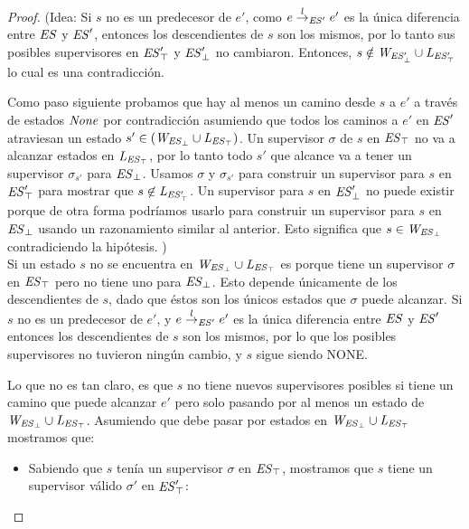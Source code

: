 \begin{proof}
	(Idea: Si $s$ no es un predecesor de $e'$, como $e \overset{l}{\rightarrow}_{\mathit{ES}'} e'$ es la única diferencia entre $\mathit{ES}$ y $\mathit{ES}'$, entonces los descendientes de $s$ son los mismos, 
	por lo tanto sus posibles supervisores en $\mathit{\mathit{ES}'_{\top}}$ y
	$\mathit{\mathit{ES}'_{\bot}}$ no cambiaron. Entonces, $s \notin \mathit{W_{\mathit{\mathit{ES}'_{\bot}}}} \cup 
	\mathit{L_{\mathit{\mathit{ES}'_{\top}}}}$ lo cual es una contradicción.
	
	Como paso siguiente probamos que hay al menos un camino desde $s$ a $e'$ a través de estados $\mathit{None}$ por contradicción asumiendo que todos los caminos a $e'$ en $\mathit{ES}'$ atraviesan un estado $s' \in 
	(\mathit{W_{\mathit{\mathit{ES}_{\bot}}}} \cup \mathit{L_{\mathit{\mathit{ES}_{\top}}}})$. Un supervisor $\sigma$ de $s$ en 
	$\mathit{\mathit{ES}_{\top}}$ no va a alcanzar estados en $\mathit{L_{\mathit{\mathit{ES}_{\top}}}}$, 
	por lo tanto todo $s'$ que alcance va a tener un supervisor $\sigma_{s'}$ para 
	$\mathit{\mathit{ES}_{\bot}}$. Usamos $\sigma$ y $\sigma_{s'}$ para construir un supervisor para $s$ en $\mathit{\mathit{ES}'_{\top}}$ para mostrar que $s 
	\not\in \mathit{L_{\mathit{\mathit{ES}'_{\top}}}}$.
	Un supervisor para $s$ en $\mathit{\mathit{ES}'_{\bot}}$ no puede existir porque de otra forma podríamos usarlo para construir un supervisor para $s$ en 
	$\mathit{\mathit{ES}_{\bot}}$ usando un razonamiento similar al anterior. Esto significa que $s \in 
	\mathit{W_{\mathit{\mathit{ES}_{\bot}}}}$ contradiciendo la hipótesis. )\\


Si un estado $s$ no se encuentra en $\mathit{W_{\mathit{\mathit{ES}_{\bot}}}} \cup \mathit{L_{\mathit{\mathit{ES}_{\top}}}}$ es porque tiene un supervisor $\sigma$ en $\mathit{\mathit{ES}_{\top}}$ pero no tiene uno para $\mathit{\mathit{ES}_{\bot}}$. Esto depende únicamente de los descendientes de $s$, dado que éstos son los únicos estados que $\sigma$ puede alcanzar. Si $s$ no es un predecesor de $e'$, y $e \overset{l}{\rightarrow}_{\mathit{ES}'} e'$ es la única diferencia entre $\mathit{ES}$ y $\mathit{ES}'$ entonces los descendientes de $s$ son los mismos, por lo que los posibles supervisores no tuvieron ningún cambio, y $s$ sigue siendo NONE.

Lo que no es tan claro, es que $s$ no tiene nuevos supervisores posibles si tiene un camino que puede alcanzar $e'$ pero solo pasando por al menos un estado de $\mathit{W_{\mathit{\mathit{ES}_{\bot}}}} \cup \mathit{L_{\mathit{\mathit{ES}_{\top}}}}$. Asumiendo que debe pasar por estados en $\mathit{W_{\mathit{\mathit{ES}_{\bot}}}} \cup \mathit{L_{\mathit{\mathit{ES}_{\top}}}}$ mostramos que:

\begin{itemize}
	\item Sabiendo que $s$ tenía un supervisor $\sigma$ en $\mathit{\mathit{ES}_{\top}}$, mostramos que $s$ tiene un supervisor válido $\sigma'$ en $\mathit{\mathit{ES}'_{\top}}$:
	

\end{itemize}
\end{proof}
